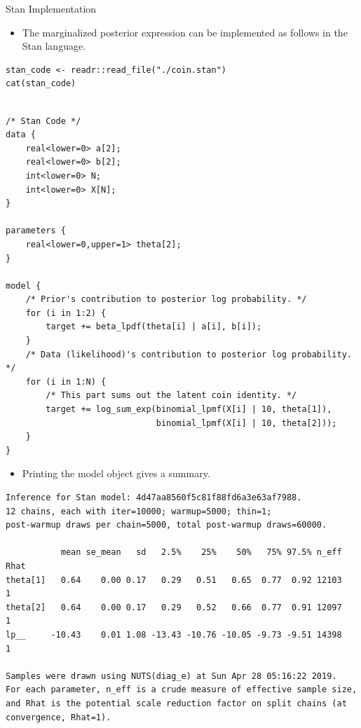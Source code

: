 \documentclass[dvipdfmx,bigger,aspectratio=169]{beamer}
\begin{document}
\begin{frame}[fragile,allowframebreaks,label=,t]{Stan Implementation}
 \begin{itemize}
\item The marginalized posterior expression can be implemented as follows in the Stan language.
\end{itemize}
\scriptsize
\begin{verbatim}
stan_code <- readr::read_file("./coin.stan")
cat(stan_code)
\end{verbatim}

\begin{verbatim}

/* Stan Code */
data {
    real<lower=0> a[2];
    real<lower=0> b[2];
    int<lower=0> N;
    int<lower=0> X[N];
}

parameters {
    real<lower=0,upper=1> theta[2];
}

model {
    /* Prior's contribution to posterior log probability. */
    for (i in 1:2) {
        target += beta_lpdf(theta[i] | a[i], b[i]);
    }
    /* Data (likelihood)'s contribution to posterior log probability. */
    for (i in 1:N) {
        /* This part sums out the latent coin identity. */
        target += log_sum_exp(binomial_lpmf(X[i] | 10, theta[1]),
                              binomial_lpmf(X[i] | 10, theta[2]));
    }
}
\end{verbatim}

\normalsize
\scriptsize
\normalsize
\newpage
\begin{itemize}
\item Printing the model object gives a summary.
\end{itemize}
\scriptsize
\begin{verbatim}
Inference for Stan model: 4d47aa8560f5c81f88fd6a3e63af7988.
12 chains, each with iter=10000; warmup=5000; thin=1; 
post-warmup draws per chain=5000, total post-warmup draws=60000.

           mean se_mean   sd   2.5%    25%    50%   75% 97.5% n_eff Rhat
theta[1]   0.64    0.00 0.17   0.29   0.51   0.65  0.77  0.92 12103    1
theta[2]   0.64    0.00 0.17   0.29   0.52   0.66  0.77  0.91 12097    1
lp__     -10.43    0.01 1.08 -13.43 -10.76 -10.05 -9.73 -9.51 14398    1

Samples were drawn using NUTS(diag_e) at Sun Apr 28 05:16:22 2019.
For each parameter, n_eff is a crude measure of effective sample size,
and Rhat is the potential scale reduction factor on split chains (at 
convergence, Rhat=1).
\end{verbatim}

\normalsize
\end{frame}
\end{document}
